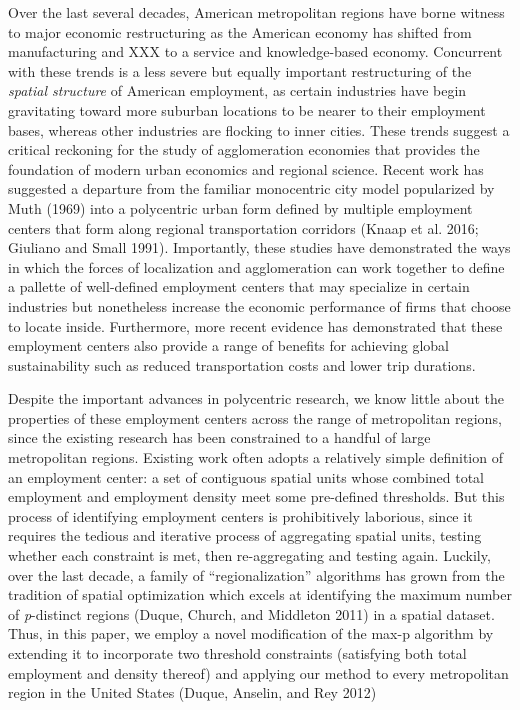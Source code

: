 \documentclass[11pt,article,oneside]{memoir}
\begin{document}
Over the last several decades, American metropolitan regions have borne
witness to major economic restructuring as the American economy has
shifted from manufacturing and XXX to a service and knowledge-based
economy. Concurrent with these trends is a less severe but equally
important restructuring of the \emph{spatial structure} of American
employment, as certain industries have begin gravitating toward more
suburban locations to be nearer to their employment bases, whereas other
industries are flocking to inner cities. These trends suggest a critical
reckoning for the study of agglomeration economies that provides the
foundation of modern urban economics and regional science. Recent work
has suggested a departure from the familiar monocentric city model
popularized by Muth (1969) into a polycentric urban form defined by
multiple employment centers that form along regional transportation
corridors (Knaap et al. 2016; Giuliano and Small 1991). Importantly,
these studies have demonstrated the ways in which the forces of
localization and agglomeration can work together to define a pallette of
well-defined employment centers that may specialize in certain
industries but nonetheless increase the economic performance of firms
that choose to locate inside. Furthermore, more recent evidence has
demonstrated that these employment centers also provide a range of
benefits for achieving global sustainability such as reduced
transportation costs and lower trip durations.

Despite the important advances in polycentric research, we know little
about the properties of these employment centers across the range of
metropolitan regions, since the existing research has been constrained
to a handful of large metropolitan regions. Existing work often adopts a
relatively simple definition of an employment center: a set of
contiguous spatial units whose combined total employment and employment
density meet some pre-defined thresholds. But this process of
identifying employment centers is prohibitively laborious, since it
requires the tedious and iterative process of aggregating spatial units,
testing whether each constraint is met, then re-aggregating and testing
again. Luckily, over the last decade, a family of ``regionalization''
algorithms has grown from the tradition of spatial optimization which
excels at identifying the maximum number of \emph{p}-distinct regions
(Duque, Church, and Middleton 2011) in a spatial dataset. Thus, in this
paper, we employ a novel modification of the max-p algorithm by
extending it to incorporate two threshold constraints (satisfying both
total employment and density thereof) and applying our method to every
metropolitan region in the United States (Duque, Anselin, and Rey 2012)
\end{document}
